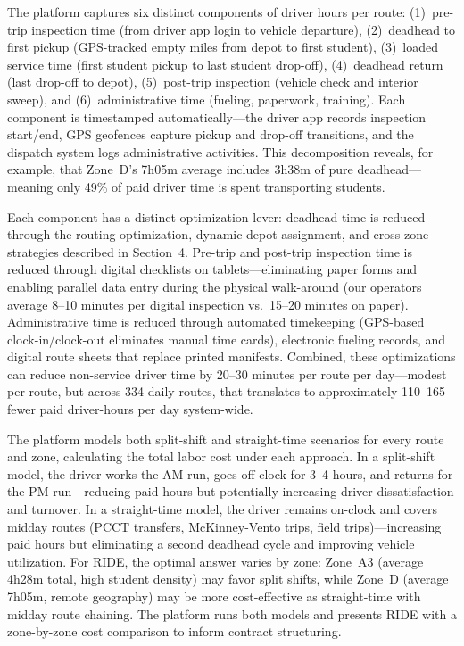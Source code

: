 \begin{description}[style=nextline, leftmargin=0.5cm]
    \item[\faIcon{clock} \textbf{Components of Driver Hours:}] The platform captures six distinct components of driver hours per route: (1)~pre-trip inspection time (from driver app login to vehicle departure), (2)~deadhead to first pickup (GPS-tracked empty miles from depot to first student), (3)~loaded service time (first student pickup to last student drop-off), (4)~deadhead return (last drop-off to depot), (5)~post-trip inspection (vehicle check and interior sweep), and (6)~administrative time (fueling, paperwork, training). Each component is timestamped automatically---the driver app records inspection start/end, GPS geofences capture pickup and drop-off transitions, and the dispatch system logs administrative activities. This decomposition reveals, for example, that Zone~D's 7h05m average includes 3h38m of pure deadhead---meaning only 49\% of paid driver time is spent transporting students.

    \item[\faIcon{compress-arrows-alt} \textbf{Optimization Levers:}] Each component has a distinct optimization lever: deadhead time is reduced through the routing optimization, dynamic depot assignment, and cross-zone strategies described in Section~4. Pre-trip and post-trip inspection time is reduced through digital checklists on tablets---eliminating paper forms and enabling parallel data entry during the physical walk-around (our operators average 8--10 minutes per digital inspection vs.\ 15--20 minutes on paper). Administrative time is reduced through automated timekeeping (GPS-based clock-in/clock-out eliminates manual time cards), electronic fueling records, and digital route sheets that replace printed manifests. Combined, these optimizations can reduce non-service driver time by 20--30 minutes per route per day---modest per route, but across 334 daily routes, that translates to approximately 110--165 fewer paid driver-hours per day system-wide.

    \item[\faIcon{users} \textbf{Split-Shift vs. Straight-Time Analysis:}] The platform models both split-shift and straight-time scenarios for every route and zone, calculating the total labor cost under each approach. In a split-shift model, the driver works the AM run, goes off-clock for 3--4 hours, and returns for the PM run---reducing paid hours but potentially increasing driver dissatisfaction and turnover. In a straight-time model, the driver remains on-clock and covers midday routes (PCCT transfers, McKinney-Vento trips, field trips)---increasing paid hours but eliminating a second deadhead cycle and improving vehicle utilization. For RIDE, the optimal answer varies by zone: Zone~A3 (average 4h28m total, high student density) may favor split shifts, while Zone~D (average 7h05m, remote geography) may be more cost-effective as straight-time with midday route chaining. The platform runs both models and presents RIDE with a zone-by-zone cost comparison to inform contract structuring.
\end{description}

